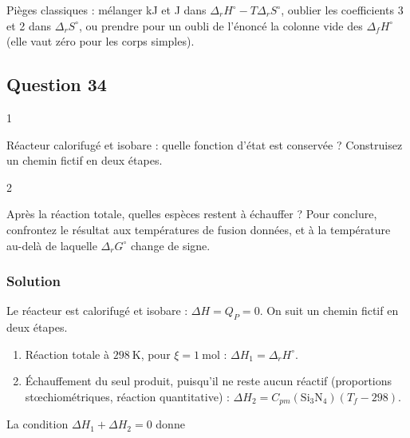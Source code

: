 \documentclass[11pt,a4paper]{article}
\providecommand{\tightlist}{\setlength{\itemsep}{0pt}\setlength{\parskip}{0pt}}
\begin{document}
\begin{piege}

Pièges classiques : mélanger kJ et J dans \(\Delta_rH^\circ-T\Delta_rS^\circ\), oublier les coefficients 3 et 2 dans \(\Delta_rS^\circ\), ou prendre pour un oubli de l'énoncé la colonne vide des \(\Delta_fH^\circ\) (elle vaut zéro pour les corps simples).

\end{piege}

\hypertarget{question-34}{%
\subsection{Question 34}\label{question-34}}

\begin{indication}{1}

Réacteur calorifugé et isobare : quelle fonction d'état est conservée ? Construisez un chemin fictif en deux étapes.

\end{indication}

\begin{indication}{2}

Après la réaction totale, quelles espèces restent à échauffer ? Pour conclure, confrontez le résultat aux températures de fusion données, et à la température au-delà de laquelle \(\Delta_rG^\circ\) change de signe.

\end{indication}

\hypertarget{solution-33}{%
\subsubsection{Solution}\label{solution-33}}

Le réacteur est calorifugé et isobare : \(\Delta H=Q_P=0\). On suit un chemin fictif en deux étapes.

\begin{enumerate}
\def\labelenumi{\arabic{enumi}.}
\tightlist
\item
  Réaction totale à \(298\ \mathrm{K}\), pour \(\xi=1\ \mathrm{mol}\) : \(\Delta H_1=\Delta_rH^\circ\).
\item
  Échauffement du seul produit, puisqu'il ne reste aucun réactif (proportions stœchiométriques, réaction quantitative) : \(\Delta H_2=C_{pm}(\mathrm{Si_3N_4})(T_f-298)\).
\end{enumerate}

La condition \(\Delta H_1+\Delta H_2=0\) donne
\end{document}
